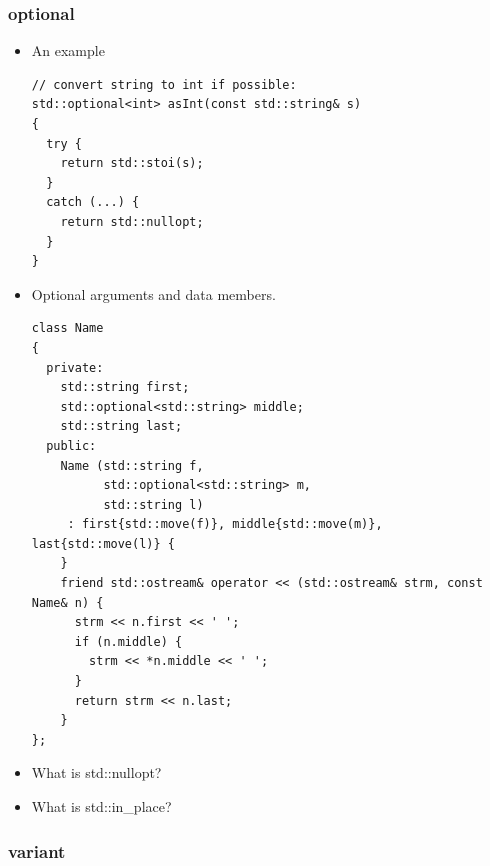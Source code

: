 \documentclass[a4paper,11pt,twoside]{book}
\begin{document}
\subsubsection{optional}
\begin{itemize}
\item An example
\begin{lstlisting}
// convert string to int if possible:
std::optional<int> asInt(const std::string& s)
{
  try {
    return std::stoi(s);
  }
  catch (...) {
    return std::nullopt;
  }
}
\end{lstlisting}
\item Optional arguments and data members.
\begin{lstlisting}
class Name
{
  private:
    std::string first;
    std::optional<std::string> middle;
    std::string last;
  public:
    Name (std::string f,
          std::optional<std::string> m,
          std::string l)
     : first{std::move(f)}, middle{std::move(m)}, last{std::move(l)} {
    }
    friend std::ostream& operator << (std::ostream& strm, const Name& n) {
      strm << n.first << ' ';
      if (n.middle) {
        strm << *n.middle << ' ';
      }
      return strm << n.last;
    }
};
\end{lstlisting}
\item What is std::nullopt? 
\item What is std::in\_place?
\end{itemize}

\subsubsection{variant}
\end{document}
